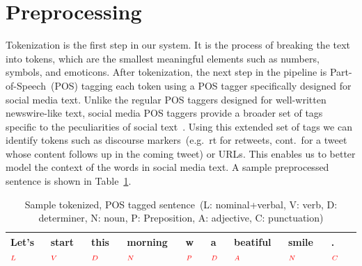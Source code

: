 \documentclass[a4paper,onesided,12pt]{report}
\begin{document}
\section{Preprocessing}


Tokenization is the first step in our system. It is the process of breaking the text into tokens, which are the smallest meaningful elements such as numbers, symbols, and emoticons. After tokenization, the next step in the pipeline is Part-of-Speech~(POS) tagging each token using a POS tagger specifically designed for social media text. Unlike the regular POS taggers designed for well-written newswire-like text, social media POS taggers provide a broader set of tags specific to the peculiarities of social text~\cite{owoputi2013improved,Gimpel:2011:PTT:2002736.2002747}. Using this extended set of tags we can identify tokens such as discourse markers~(e.g.~rt for retweets, cont.~for a tweet whose content follows up in the coming tweet) or URLs. This enables us to better model the context of the words in social media text. A sample preprocessed sentence is shown in Table~\ref{tab:postagged}.

\begin{table}[tbhp]
\caption{Sample tokenized, POS tagged sentence~(L: nominal+verbal, V: verb, D: determiner, N: noun, P: Preposition, A: adjective, C: punctuation)}
\centering
\begin{tabular}{|l|l|l|l|l|l|l|l|l|l|}
\hline
Let's$_{\textcolor{red}{L}}$ & start$_{\textcolor{red}V}$ & this$_{\textcolor{red}D}$ & morning$_{\textcolor{red}N}$ & w$_{\textcolor{red}P}$ & a$_{\textcolor{red}D}$ & beatiful$_{\textcolor{red}A}$ & smile$_{\textcolor{red}N}$ & .$_{\textcolor{red}C}$\\
\hline
\end{tabular}
\label{tab:postagged}
\end{table}
\end{document}
